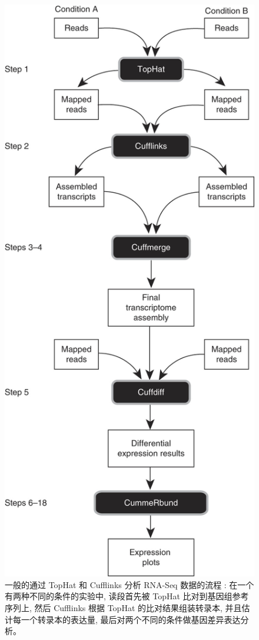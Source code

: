 \begin{figure}[!t]
\centering
\includegraphics[height=0.85\textheight]{figures/tuxedo-protocol-tophat-cufflinks.jpg}
\caption[一般的通过 TopHat \cite {trapnell2009tophat} 和 Cufflinks 
\cite{cufflinks.2010} 分析 RNA-Seq 数据的流程 \cite{trapnell2012differential}]
{一般的通过 TopHat \cite {trapnell2009tophat} 和 Cufflinks 
\cite{cufflinks.2010} 分析 RNA-Seq 数据的流程 \cite{trapnell2012differential}: 
在一个有两种不同的条件的实验中, 读段首先被 TopHat 比对到基因组参考序列上, 
然后 Cufflinks 根据 TopHat 的比对结果组装转录本, 并且估计每一个转录本的表达量, 
最后对两个不同的条件做基因差异表达分析。}
\label{intro-rna-seq-anal}
\end{figure}

